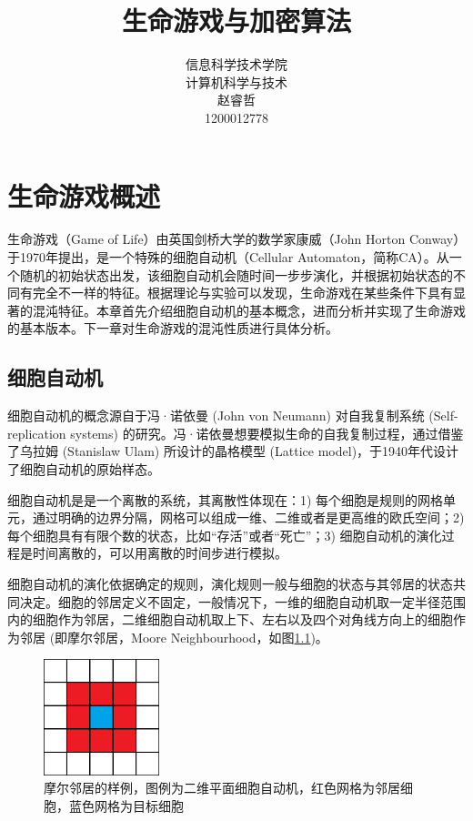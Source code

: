 \documentclass[a4paper,12pt]{report}
\begin{document}
\title{生命游戏与加密算法}
\author{
	信息科学技术学院\\
	计算机科学与技术\\
	赵睿哲\\
	1200012778}
\maketitle

\begin{abstract}

\end{abstract}

\tableofcontents

\chapter{生命游戏概述}

生命游戏（Game of Life）由英国剑桥大学的数学家康威（John Horton Conway）于1970年提出，是一个特殊的细胞自动机（Cellular Automaton，简称CA）。从一个随机的初始状态出发，该细胞自动机会随时间一步步演化，并根据初始状态的不同有完全不一样的特征。根据理论与实验可以发现，生命游戏在某些条件下具有显著的混沌特征。本章首先介绍细胞自动机的基本概念，进而分析并实现了生命游戏的基本版本。下一章对生命游戏的混沌性质进行具体分析。

\section{细胞自动机}

细胞自动机的概念源自于冯·诺依曼 (John von Neumann) 对自我复制系统 (Self-replication systems) 的研究。冯·诺依曼想要模拟生命的自我复制过程，通过借鉴了乌拉姆 (Stanislaw Ulam) 所设计的晶格模型 (Lattice model)，于1940年代设计了细胞自动机的原始样态。

细胞自动机是是一个离散的系统，其离散性体现在：1) 每个细胞是规则的网格单元，通过明确的边界分隔，网格可以组成一维、二维或者是更高维的欧氏空间；2) 每个细胞具有有限个数的状态，比如“存活”或者“死亡”；3) 细胞自动机的演化过程是时间离散的，可以用离散的时间步进行模拟。

细胞自动机的演化依据确定的规则，演化规则一般与细胞的状态与其邻居的状态共同决定。细胞的邻居定义不固定，一般情况下，一维的细胞自动机取一定半径范围内的细胞作为邻居，二维细胞自动机取上下、左右以及四个对角线方向上的细胞作为邻居 (即摩尔邻居，Moore Neighbourhood，如图\ref{fig:moore})。

\begin{figure}[!ht]
\centering
\includegraphics[width=0.3\textwidth]{images/CA-Moore.png}
\caption{摩尔邻居的样例，图例为二维平面细胞自动机，红色网格为邻居细胞，蓝色网格为目标细胞}
\label{fig:moore}
\end{figure}
\end{document}
